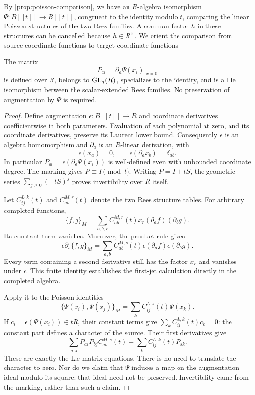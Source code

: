 By \cref{prop:poisson-comparison}, we have an $R$-algebra isomorphism
$\Psi:B[[t]]\to B[[t]]$, congruent to the identity modulo $t$, comparing
the linear Poisson structures of the two Rees families. A common factor
$h$ in these structures can be cancelled because $h\in R^\times$.
We orient the comparison from source coordinate functions to target
coordinate functions.

\begin{lemma}\label{lem:first-jet}
The matrix
\[
 P_{ai}=\left.\partial_a\Psi(x_i)\right|_{x=0}
\]
is defined over $R$, belongs to $\operatorname{GL}_n(R)$, specializes to the identity,
and is a Lie isomorphism between the scalar-extended Rees families.
No preservation of augmentation by $\Psi$ is required.
\end{lemma}

\begin{proof}
Define augmentation $\epsilon:B[[t]]\to R$ and coordinate derivatives
coefficientwise in both parameters. Evaluation of each polynomial at
zero, and its coordinate derivatives, preserve its Laurent lower bound.
Consequently $\epsilon$ is an algebra homomorphism and $\partial_a$ is an
$R$-linear derivation, with
\[
 \epsilon(x_a)=0,\qquad \epsilon(\partial_a x_b)=\delta_{ab}.
\]
In particular $P_{ai}=\epsilon(\partial_a\Psi(x_i))$ is well-defined even
with unbounded coordinate degree. The marking gives $P\equiv I\pmod t$.
Writing $P=I+tS$, the geometric series $\sum_{j\geq0}(-tS)^j$ proves
invertibility over $R$ itself.

Let $C^{L,k}_{ij}(t)$ and $C^{M,r}_{ab}(t)$ denote the two Rees structure
tables. For arbitrary completed functions,
\[
 \{f,g\}_M=\sum_{a,b,r}C^{M,r}_{ab}(t)x_r
                         (\partial_a f)(\partial_b g).
\]
Its constant term vanishes. Moreover, the product rule gives
\[
 \epsilon\partial_s\{f,g\}_M
 =\sum_{a,b}C^{M,s}_{ab}(t)
                 \epsilon(\partial_a f)\epsilon(\partial_b g).
\]
Every term containing a second derivative still has the factor $x_r$
and vanishes under $\epsilon$. This finite identity establishes the
first-jet calculation directly in the completed algebra.

Apply it to the Poisson identities
\[
 \{\Psi(x_i),\Psi(x_j)\}_M
       =\sum_k C^{L,k}_{ij}(t)\Psi(x_k).
\]
If $c_i=\epsilon(\Psi(x_i))\in tR$, their constant terms give
$\sum_k C^{L,k}_{ij}(t)c_k=0$: the constant part defines a character of
the source. Their first derivatives give
\begin{equation}\label{eq:first-jet-matrix}
 \sum_{a,b}P_{ai}P_{bj}C^{M,s}_{ab}(t)
       =\sum_k C^{L,k}_{ij}(t)P_{sk}.
\end{equation}
These are exactly the Lie-matrix equations. There is no need to translate
the character to zero. Nor do we claim that $\Psi$ induces a map on the
augmentation ideal modulo its square: that ideal need not be preserved.
Invertibility came from the marking, rather than such a claim.
\end{proof}

